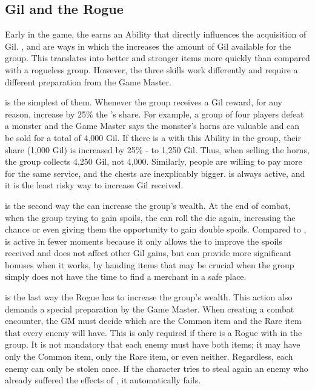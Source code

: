 \begin{multicols}{2}
\subsection{Gil and the Rogue}
\label{subsec:inv-rogue}
Early in the game, the  earns an Ability that directly influences the acquisition of Gil. ,  and  are ways in which the  increases the amount of Gil available for the group. This translates into better and stronger items more quickly than compared with a rogueless group. However, the three skills work differently and require a different preparation from the Game Master.

 is the simplest of them. Whenever the group receives a Gil reward, for any reason, increase by 25\% the ’s share. For example, a group of four players defeat a monster and the Game Master says the monster’s horns are valuable and can be sold for a total of 4,000 Gil. If there is a  with this Ability in the group, their share (1,000 Gil) is increased by 25\% - to 1,250 Gil. Thus, when selling the horns, the group collects 4,250 Gil, not 4,000. Similarly, people are willing to pay more for the same service, and the chests are inexplicably bigger.  is always active, and it is the least risky way to increase Gil received.

\begin{center}
\end{center}

 is the second way the  can increase the group’s wealth. At the end of combat, when the group trying to gain spoils, the  can roll the die again, increasing the chance or even giving them the opportunity to gain double spoils. Compared to ,  is active in fewer moments because it only allows the  to improve the spoils received and does not affect other Gil gains, but can provide more significant bonuses when it works, by handing items that may be crucial when the group simply does not have the time to find a merchant in a safe place.

 is the last way the Rogue has to increase the group’s wealth. This action also demands a special preparation by the Game Master. When creating a combat encounter, the GM must decide which are the Common item and the Rare item that every enemy will have. This is only required if there is a Rogue with  in the group. It is not mandatory that each enemy must have both items; it may have only the Common item, only the Rare item, or even neither. Regardless, each enemy can only be stolen once. If the character tries to steal again an enemy who already suffered the effects of , it automatically fails.


\end{multicols}
